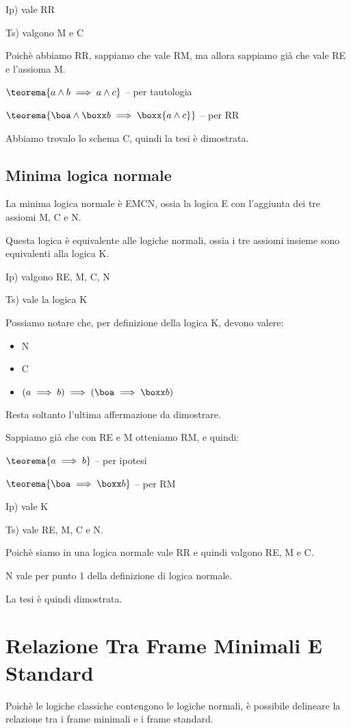 Ip) vale RR

Ts) valgono M e C

Poichè abbiamo RR, sappiamo che vale RM, ma allora sappiamo già che
vale RE e l'assioma M.

$\teorema{a\wedge b\implies a\wedge c}$ -- per tautologia

$\teorema{\boa\wedge\boxx b\implies\boxx{a\wedge c}}$ -- per RR

Abbiamo trovalo lo schema C, quindi la tesi è dimostrata.


\subsection{Minima logica normale}

La minima logica normale è EMCN, ossia la logica E con l'aggiunta
dei tre assiomi M, C e N.

Questa logica è equivalente alle logiche normali, ossia i tre assiomi
insieme sono equivalenti alla logica K.

Ip) valgono RE, M, C, N

Ts) vale la logica K

Possiamo notare che, per definizione della logica K, devono valere:
\begin{itemize}
\item N 
\item C
\item $(a\implies b)\implies(\boa\implies\boxx b)$
\end{itemize}
Resta soltanto l'ultima affermazione da dimostrare.

Sappiamo già che con RE e M otteniamo RM, e quindi:

$\teorema{a\implies b}$ -- per ipotesi

$\teorema{\boa\implies\boxx b}$ -- per RM

Ip) vale K

Ts) vale RE, M, C e N.

Poichè siamo in una logica normale vale RR e quindi valgono RE, M
e C.

N vale per punto 1 della definizione di logica normale.

La tesi è quindi dimostrata.


\section{Relazione Tra Frame Minimali E Standard}

Poichè le logiche classiche contengono le logiche normali, è possibile
delineare la relazione tra i frame minimali e i frame standard.


